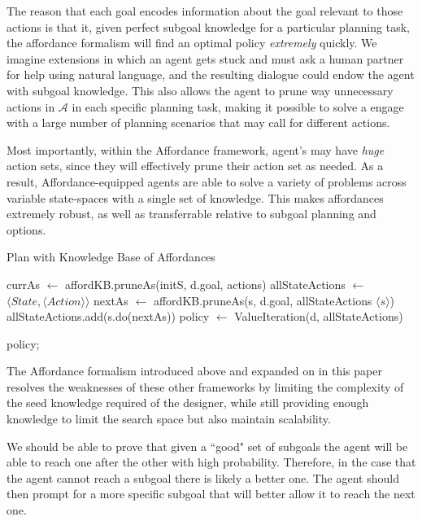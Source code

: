 \documentclass[]{article}
\begin{document}
The reason that each goal encodes information about the goal relevant to those actions is that it, given perfect subgoal knowledge for a particular planning task, the affordance formalism will find an optimal policy {\it extremely} quickly. We imagine extensions in which an agent gets stuck and must ask a human partner for help using natural language, and the resulting dialogue could endow the agent with subgoal knowledge. This also allows the agent to prune way unnecessary actions in $\mathcal{A}$ in each specific planning task, making it possible to solve a engage with a large number of planning scenarios that may call for different actions.

Most importantly, within the Affordance framework, agent's may have {\it huge} action sets, since they will effectively prune their action set as needed. As a result, Affordance-equipped agents are able to solve a variety of problems across variable state-spaces with a single set of knowledge. This makes affordances extremely robust, as well as transferrable relative to subgoal planning and options.


\begin{algorithm}
  \caption{Plan with Knowledge Base of Affordances}

  \begin{algorithmic}
    \State {}
    \State currAs $\gets$ affordKB.pruneAs(initS, d.goal, actions)
    \State allStateActions $\gets$ $\langle State ,\langle Action \rangle \rangle$
	\State nextAs $\gets$ affordKB.pruneAs(s, d.goal, allStateActions $\langle s \rangle$)
	\State allStateActions.add(s.do(nextAs))
    \EndFor
    \State {}
    \State policy $\gets$ ValueIteration(d, allStateActions)
    
    \Return policy;
  \end{algorithmic}
\end{algorithm}


The Affordance formalism introduced above and expanded on in this paper resolves the weaknesses of these other frameworks by limiting the complexity of the seed knowledge required of the designer, while still providing enough knowledge to limit the search space but also maintain scalability.

We should be able to prove that given a ``good" set of subgoals the agent will be able to reach one after the other with high probability. Therefore, in the case that the agent cannot reach a subgoal there is likely a better one. The agent should then prompt for a more specific subgoal that will better allow it to reach the next one.
\end{document}

